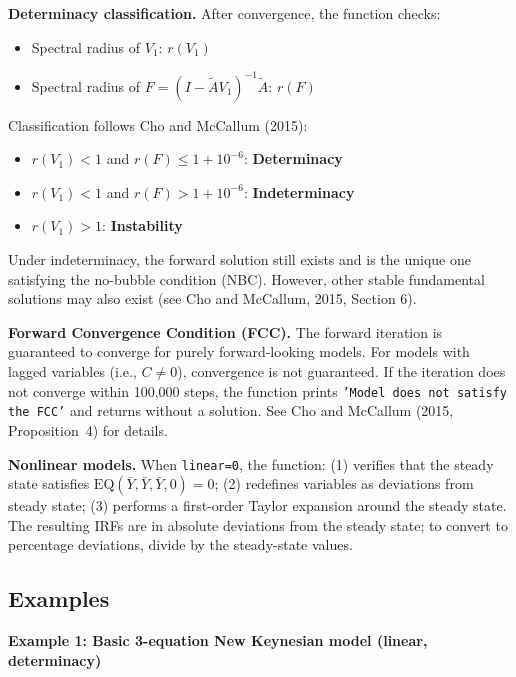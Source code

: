 \documentclass{article}
\begin{document}
\medskip
\noindent\textbf{Determinacy classification.} After convergence, the function checks:
\begin{itemize}[nosep]
\item Spectral radius of $V_1$: $r(V_1)$
\item Spectral radius of $F = (I - \tilde{A} V_1)^{-1} \tilde{A}$: $r(F)$
\end{itemize}
Classification follows Cho and McCallum (2015):
\begin{itemize}[nosep]
\item $r(V_1) < 1$ and $r(F) \leq 1 + 10^{-6}$: \textbf{Determinacy}
\item $r(V_1) < 1$ and $r(F) > 1 + 10^{-6}$: \textbf{Indeterminacy}
\item $r(V_1) > 1$: \textbf{Instability}
\end{itemize}
Under indeterminacy, the forward solution still exists and is the unique one satisfying the no-bubble condition (NBC). However, other stable fundamental solutions may also exist (see Cho and McCallum, 2015, Section 6).

\medskip
\noindent\textbf{Forward Convergence Condition (FCC).} The forward iteration is guaranteed to converge for purely forward-looking models. For models with lagged variables (i.e., $C \neq 0$), convergence is not guaranteed. If the iteration does not converge within 100,000 steps, the function prints \texttt{'Model does not satisfy the FCC'} and returns without a solution. See Cho and McCallum (2015, Proposition~4) for details.

\medskip
\noindent\textbf{Nonlinear models.} When \texttt{linear=0}, the function: (1) verifies that the steady state satisfies $\text{EQ}(\bar{Y}, \bar{Y}, \bar{Y}, 0) = 0$; (2) redefines variables as deviations from steady state; (3) performs a first-order Taylor expansion around the steady state. The resulting IRFs are in absolute deviations from the steady state; to convert to percentage deviations, divide by the steady-state values.

\subsection{Examples}

\noindent\textbf{Example 1: Basic 3-equation New Keynesian model (linear, determinacy)}
\end{document}

